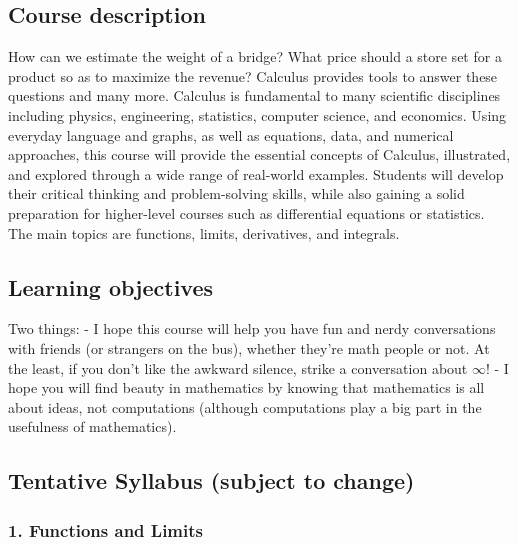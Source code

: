 \documentclass[
]{article}
\begin{document}
\hypertarget{course-description}{%
\subsection*{Course description}\label{course-description}}

How can we estimate the weight of a bridge? What price should a store set for a product so as to maximize the revenue? Calculus provides tools to answer these questions and many more. Calculus is fundamental to many scientific disciplines including physics, engineering, statistics, computer science, and economics. Using everyday language and graphs, as well as equations, data, and numerical approaches, this course will provide the essential concepts of Calculus, illustrated, and explored through a wide range of real-world examples. Students will develop their critical thinking and problem-solving skills, while also gaining a solid preparation for higher-level courses such as differential equations or statistics. The main topics are functions, limits, derivatives, and integrals.

\hypertarget{learning-objectives}{%
\subsection*{Learning objectives}\label{learning-objectives}}

Two things:
- I hope this course will help you have fun and nerdy conversations with friends (or strangers on the bus), whether they're math people or not.
At the least, if you don't like the awkward silence, strike a conversation about \(\infty\)!
- I hope you will find beauty in mathematics by knowing that mathematics is all about ideas,
not computations (although computations play a big part in the usefulness of mathematics).

\hypertarget{tentative-syllabus-subject-to-change}{%
\subsection*{Tentative Syllabus (subject to change)}\label{tentative-syllabus-subject-to-change}}

\hypertarget{functions-and-limits}{%
\subsubsection*{1. Functions and Limits}\label{functions-and-limits}}
\end{document}
